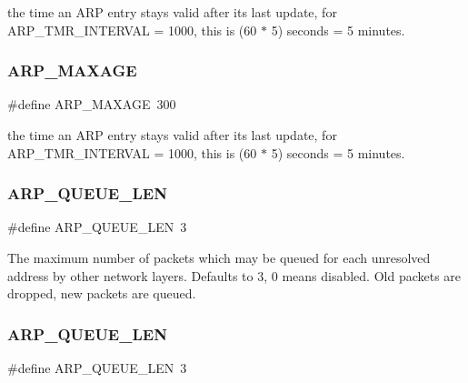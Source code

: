 the time an A\+RP entry stays valid after its last update, for A\+R\+P\+\_\+\+T\+M\+R\+\_\+\+I\+N\+T\+E\+R\+V\+AL = 1000, this is (60 $\ast$ 5) seconds = 5 minutes. \mbox{\label{group__lwip__opts__arp_ga741a0710dc126ed3ae9e305472df3432}} 
\subsubsection{\texorpdfstring{A\+R\+P\+\_\+\+M\+A\+X\+A\+GE}{ARP\_MAXAGE}\hspace{0.1cm}{\footnotesize\ttfamily [2/2]}}
{\footnotesize\ttfamily \#define A\+R\+P\+\_\+\+M\+A\+X\+A\+GE~300}

the time an A\+RP entry stays valid after its last update, for A\+R\+P\+\_\+\+T\+M\+R\+\_\+\+I\+N\+T\+E\+R\+V\+AL = 1000, this is (60 $\ast$ 5) seconds = 5 minutes. \mbox{\label{group__lwip__opts__arp_ga29f41a6ebdbb23f46688d381b3609fd1}} 
\subsubsection{\texorpdfstring{A\+R\+P\+\_\+\+Q\+U\+E\+U\+E\+\_\+\+L\+EN}{ARP\_QUEUE\_LEN}\hspace{0.1cm}{\footnotesize\ttfamily [1/2]}}
{\footnotesize\ttfamily \#define A\+R\+P\+\_\+\+Q\+U\+E\+U\+E\+\_\+\+L\+EN~3}

The maximum number of packets which may be queued for each unresolved address by other network layers. Defaults to 3, 0 means disabled. Old packets are dropped, new packets are queued. \mbox{\label{group__lwip__opts__arp_ga29f41a6ebdbb23f46688d381b3609fd1}} 
\subsubsection{\texorpdfstring{A\+R\+P\+\_\+\+Q\+U\+E\+U\+E\+\_\+\+L\+EN}{ARP\_QUEUE\_LEN}\hspace{0.1cm}{\footnotesize\ttfamily [2/2]}}
{\footnotesize\ttfamily \#define A\+R\+P\+\_\+\+Q\+U\+E\+U\+E\+\_\+\+L\+EN~3}

